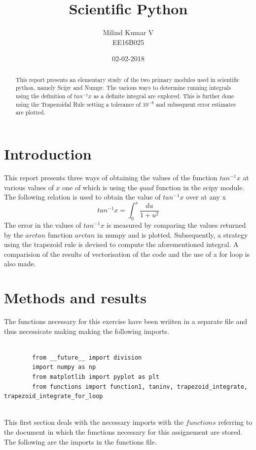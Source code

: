 \documentclass[a4paper, 12pt, margin= 1.25cm ]{article}
\title{Scientific Python}
\date{02-02-2018}
\author{Milind Kumar V\\ EE16B025}
\begin{document}
	\maketitle
	\newpage
	
	\begin{abstract}
	This report presents an elementary study of the two primary modules used in scientific python, namely Scipy and Numpy. The various ways to determine running integrals using the definition of $tan^{-1}x$ as a definite integral are explored. This is further done using the Trapezoidal Rule setting a tolerance of $10^{-8}$ and subsequent error estimates are plotted.
	\end{abstract}
	\section{Introduction}     
	This report presents three ways of obtaining the values of the function $tan^{-1}x$ at various values of $x$ one of which is using the $quad$ function in the scipy module. The following relation is used to obtain the value of $tan^{-1}x$ over at any x
		\begin{equation*}\label{equation1}
		tan^{-1}x= \int^x_0 \frac{du}{1+u^2}
		\end{equation*}
	The error in the values of $tan^{-1}x$ is measured by comparing the values returned by the $arctan$ function $arctan$ in numpy and is plotted. Subsequently, a strategy using the trapezoid rule is devised to compute the aforementioned integral. A comparision of the results of vectorisation of the code and the use of a for loop is also made.

	\section{Methods and results}
	The functions necessary for this exercise have been wriiten in a separate file and thus necessicate making making the following imports.

		\begin{lstlisting}

		from __future__ import division
		import numpy as np
		from matplotlib import pyplot as plt
		from functions import function1, taninv, trapezoid_integrate, trapezoid_integrate_for_loop
		
		\end{lstlisting}

	This first section deals with the necessary imports with the $functions$ referring to the document in which the functions necessary for this assignement are stored. The following are the imports in the functions file.
\end{document}
